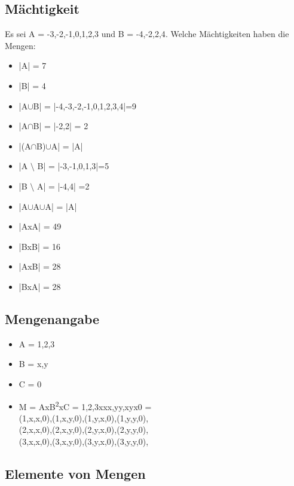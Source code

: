 \subsection{Mächtigkeit}
Es sei A = {-3,-2,-1,0,1,2,3} und B = {-4,-2,2,4}. Welche Mächtigkeiten
haben die Mengen:
\begin{itemize}
    \item |A| = 7
    \item |B| = 4
    \item |A$\cup$B| = |{-4,-3,-2,-1,0,1,2,3,4}|=9
    \item |A$\cap$B| = |{-2,2}| = 2
    \item |(A$\cap$B)$\cup$A| = |A|
    \item |A $\setminus$ B| = |{-3,-1,0,1,3}|=5
    \item |B $\setminus$ A| = |{-4,4}| =2
    \item |A$\cup$A$\cup$A| = |A|
    \item |AxA| = 49
    \item |BxB| = 16
    \item |AxB| = 28
    \item |BxA| = 28
\end{itemize}
\subsection{Mengenangabe}
    \begin{itemize}
        \item A = {1,2,3}
        \item B = {x,y}
        \item C = {0}
        \item M = AxB\textsuperscript{2}xC = {1,2,3}x{xx,yy,xy}x{0} =\\
        {
            (1,x,x,0),(1,x,y,0),(1,y,x,0),(1,y,y,0),\\
            (2,x,x,0),(2,x,y,0),(2,y,x,0),(2,y,y,0),\\
            (3,x,x,0),(3,x,y,0),(3,y,x,0),(3,y,y,0),
        }
    \end{itemize}
\subsection{Elemente von Mengen}
